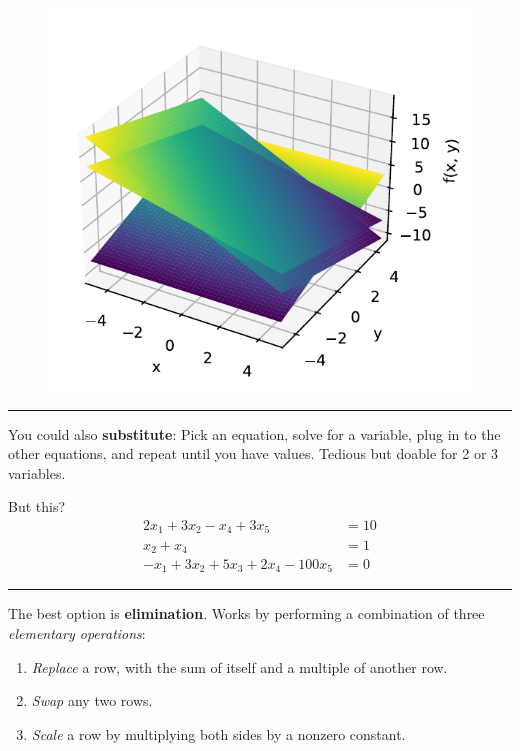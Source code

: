 \documentclass[
  letterpaper,
  DIV=11,
  numbers=noendperiod]{scrartcl}
\providecommand{\tightlist}{%
  \setlength{\itemsep}{0pt}\setlength{\parskip}{0pt}}\usepackage{longtable,booktabs,array}
\begin{document}
\begin{figure}[H]

{\centering \includegraphics{302-linearsystems_files/figure-pdf/cell-3-output-1.pdf}

}

\end{figure}

\begin{center}\rule{0.5\linewidth}{0.5pt}\end{center}

You could also \textbf{substitute}: Pick an equation, solve for a
variable, plug in to the other equations, and repeat until you have
values. Tedious but doable for 2 or 3 variables.

But this? \[\begin{align*}
2x_1 + 3x_2 - x_4 + 3x_5 &= 10 \\
x_2 + x_4 &= 1 \\
-x_1 + 3x_2 + 5x_3 + 2x_4 - 100x_5 &= 0 
\end{align*}\]

\begin{center}\rule{0.5\linewidth}{0.5pt}\end{center}

The best option is \textbf{elimination}. Works by performing a
combination of three \emph{elementary operations}:

\begin{enumerate}
\def\labelenumi{\arabic{enumi}.}
\tightlist
\item
  \emph{Replace} a row, with the sum of itself and a multiple of another
  row.
\item
  \emph{Swap} any two rows.
\item
  \emph{Scale} a row by multiplying both sides by a nonzero constant.
\end{enumerate}
\end{document}
